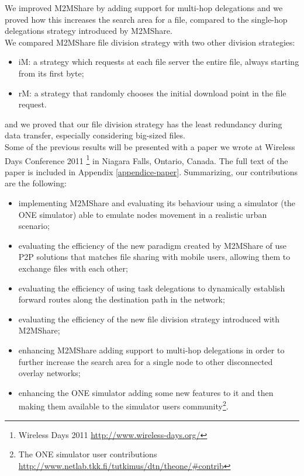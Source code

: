 We improved M2MShare by adding support for multi-hop delegations and we proved how this increases the search area for a file, compared to the single-hop delegations strategy introduced by M2MShare.
\\

We compared M2MShare file division strategy with two other division strategies:
\begin{itemize}
\item iM: a strategy which requests at each file server the entire file, always starting from its first byte;
\item rM: a strategy that randomly chooses the initial download point in the file request.
\end{itemize}
and we proved that our file division strategy has the least redundancy during data transfer, especially considering big-sized files.
\\

Some of the previous results will be presented with a paper we wrote at Wireless Days Conference 2011 \footnote{Wireless Days 2011 \href{http://www.wireless-days.org/}{http://www.wireless-days.org/}} in Niagara Falls, Ontario, Canada. The full text of the paper is included in Appendix \ref{appendice-paper}.
Summarizing, our contributions are the following:
\begin{itemize}
\item implementing M2MShare and evaluating its behaviour using a simulator (the ONE simulator) able to emulate nodes movement in a realistic urban scenario;
\item evaluating the efficiency of the new paradigm created by M2MShare of use P2P solutions that matches file sharing with mobile users, allowing them to exchange files with each other;
\item evaluating the efficiency of using task delegations to dynamically establish forward routes along the destination path in the network;
\item evaluating the efficiency of the new file division strategy introduced with M2MShare; 
\item enhancing M2MShare adding support to multi-hop delegations in order to further increase the search area for a single node to other disconnected overlay networks;
\item enhancing the ONE simulator adding some new features to it and then making them available to the simulator users community\footnote{The ONE simulator user contributions \href{http://www.netlab.tkk.fi/tutkimus/dtn/theone/\#contrib}{http://www.netlab.tkk.fi/tutkimus/dtn/theone/\#contrib}}.
\end{itemize}

